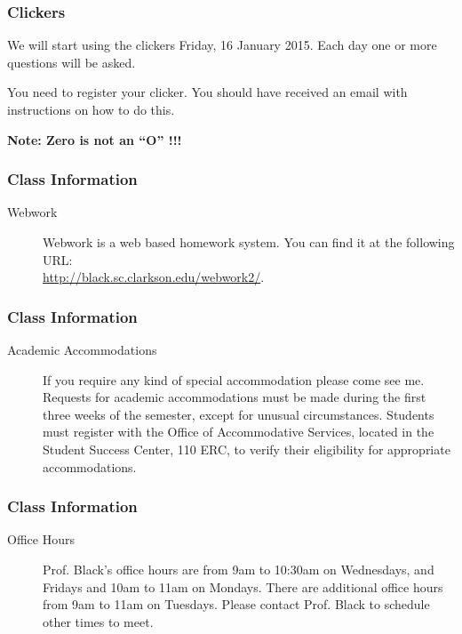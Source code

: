 \begin{frame}
  \frametitle{Clickers}

  We will start using the clickers Friday, 16 January 2015. Each day
  one or more questions will be asked.

  You need to register your clicker. You should have received an email
  with instructions on how to do this. 

  \textbf{Note: Zero is not an ``O''  !!!}
  
\end{frame}


\begin{frame}
  \frametitle{Class Information}

\begin{description}
  \item[Webwork] Webwork is a web based homework system. You can find
    it at the following URL: \\
    \url{http://black.sc.clarkson.edu/webwork2/}.
\end{description}

\end{frame}


\begin{frame}
  \frametitle{Class Information}

\begin{description}
  \item[Academic Accommodations] If you require any kind of special
    accommodation please come see me.  Requests for academic
    accommodations must be made during the first three weeks of the
    semester, except for unusual circumstances.  Students must
    register with the Office of Accommodative Services, located in the
    Student Success Center, 110 ERC, to verify their eligibility for
    appropriate accommodations.


\end{description}


\end{frame}

\begin{frame}
  \frametitle{Class Information}

\begin{description}
\item[Office Hours] Prof. Black's office hours are from 9am to 10:30am
  on Wednesdays, and Fridays and 10am to 11am on Mondays. There are
  additional office hours from 9am to 11am on Tuesdays. Please contact
  Prof. Black to schedule other times to meet.

\end{description}


\end{frame}

